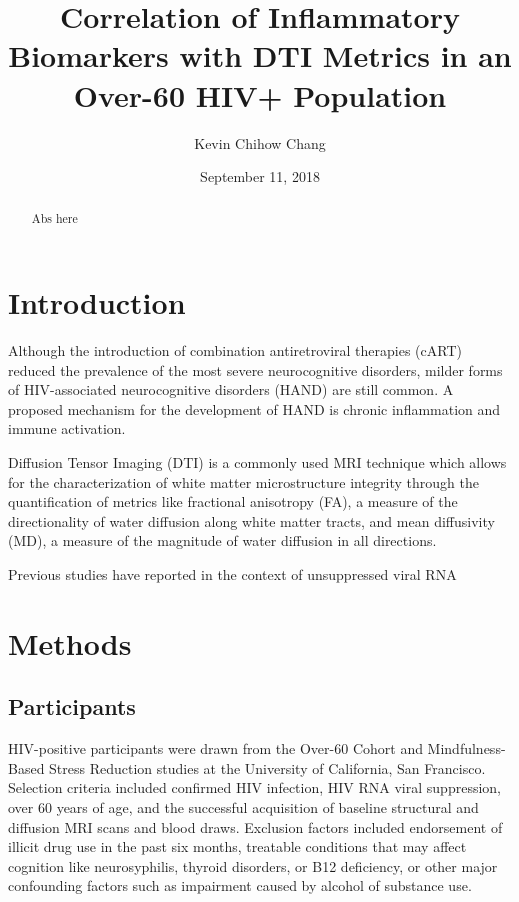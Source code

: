 \documentclass{article}
\title{Correlation of Inflammatory Biomarkers with DTI Metrics in an Over-60 HIV+ Population}
\author{Kevin Chihow Chang}
\date{September 11, 2018}
\begin{document}
\maketitle

\begin{abstract}
    Abs here
\end{abstract}

\section{Introduction}
Although the introduction of combination antiretroviral therapies (cART) reduced the prevalence of the most severe neurocognitive disorders, milder forms of HIV-associated neurocognitive disorders (HAND) are still common.\cite{Heaton2010HIV-associatedStudy} A proposed mechanism for the development of HAND is chronic inflammation and immune activation. %


Diffusion Tensor Imaging (DTI) is a commonly used MRI technique which allows for the characterization of white matter microstructure integrity through the quantification of metrics like fractional anisotropy (FA), a measure of the directionality of water diffusion along white matter tracts, and mean diffusivity (MD), a measure of the magnitude of water diffusion in all directions.\cite{Basser1996MicrostructuralMRI.,Alexander2007DiffusionBrain.}

Previous studies have reported %
in the context of unsuppressed viral RNA 





\section{Methods}
\subsection{Participants}
HIV-positive participants were drawn from the Over-60 Cohort and Mindfulness-Based Stress Reduction studies at the University of California, San Francisco. Selection criteria included confirmed HIV infection, HIV RNA viral suppression, over 60 years of age, and the successful acquisition of baseline structural and diffusion MRI scans and blood draws. Exclusion factors included endorsement of illicit drug use in the past six months, treatable conditions that may affect cognition like neurosyphilis, thyroid disorders, or B12 deficiency, or other major confounding factors such as impairment caused by alcohol of substance use.
\end{document}
